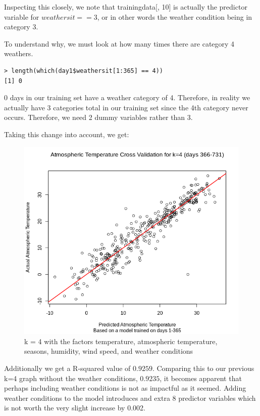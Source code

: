 \documentclass[12pt]{article}
\begin{document}
Inspecting this closely, we note that trainingdata[, 10] is actually the predictor variable for $weathersit == 3$, or in other words the weather condition being in category 3.

To understand why, we must look at how many times there are category 4 weathers.

\begin{verbatim}
> length(which(day1$weathersit[1:365] == 4))
[1] 0
\end{verbatim}

0 days in our training set have a weather category of 4. Therefore, in reality we actually have 3 categories total in our training set since the 4th category never occurs. Therefore, we need 2 dummy variables rather than 3.

Taking this change into account, we get:
\begin{figure}[H]
	\centering
  	\includegraphics[width=150mm]{atempextrak=4.png}
 	\caption{k = 4 with the factors temperature, atmospheric temperature, seasons, humidity, wind speed, and weather conditions}
 	\label{fig:atempextra}
\end{figure}

Additionally we get a R-squared value of $0.9259$. Comparing this to our previous k=4 graph without the weather conditions, $0.9235$, it becomes apparent that perhaps including weather conditions is not as impactful as it seemed. Adding weather conditions to the model introduces and extra 8 predictor variables which is not worth the very slight increase by 0.002.
\end{document}
